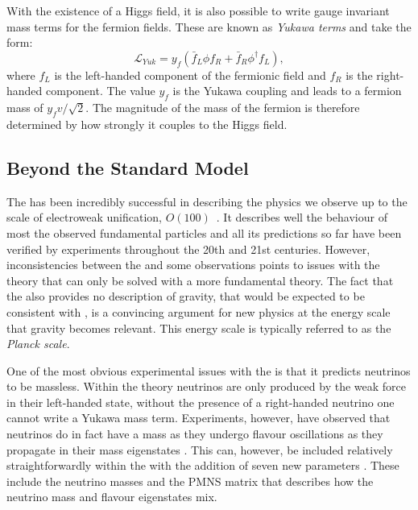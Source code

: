 With the existence of a Higgs field, it is also possible to write
gauge invariant mass terms for the fermion fields. These are known as
\emph{Yukawa terms} and take the form:
\begin{equation}
  \mathcal{L}_{Yuk}=y_{f}\left(\bar{f}_{L}\phi f_{R}+\bar{f}_{R}\phi^{\dag}f_{L}\right),
\end{equation}
where $f_L$ is the left-handed component of the fermionic field and
$f_R$ is the right-handed component. The value $y_f$ is the Yukawa
coupling and leads to a fermion mass of $y_fv/\sqrt{2}$. The magnitude
of the mass of the fermion is therefore determined by how strongly it
couples to the Higgs field.

\subsection{Beyond the Standard Model}

The \SM has been incredibly successful in describing the physics we
observe up to the scale of electroweak unification, $O(100)$~\gev. It
describes well the behaviour of most the observed fundamental
particles and all its predictions so far have been verified by
experiments throughout the 20th and 21st centuries. However,
inconsistencies between the \SM and some observations points to issues
with the theory that can only be solved with a more fundamental \BSM
theory. The fact that the \SM also provides no description of gravity,
that would be expected to be consistent with \GR, is a convincing
argument for new physics at the energy scale that gravity becomes
relevant. This energy scale is typically referred to as the
\emph{Planck scale}.

One of the most obvious experimental issues with the \SM is that it
predicts neutrinos to be massless. Within the theory neutrinos are
only produced by the weak force in their left-handed state, without
the presence of a right-handed neutrino one cannot write a Yukawa mass
term.  Experiments, however, have observed that neutrinos do in fact
have a mass as they undergo flavour oscillations as they propagate in
their mass eigenstates \cite{PhysRevLett.87.071301,Fukuda:1998mi}.
This can, however, be included relatively straightforwardly within the
\SM with the addition of seven new parameters
\cite{doi:10.1143/PTP.28.870}.  These include the neutrino masses and
the \ac{PMNS} matrix that describes how the neutrino mass and flavour
eigenstates mix.


